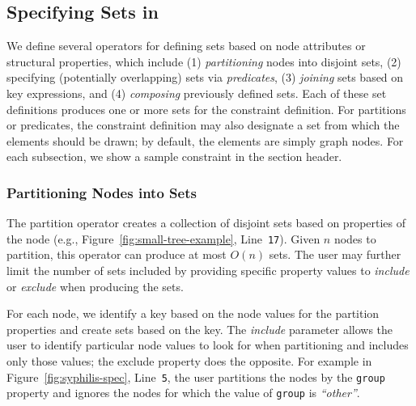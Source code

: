 \subsection{Specifying Sets in \projectname}
We define several operators for defining sets based on node attributes 
or structural properties, which include (1) \emph{partitioning} nodes 
into disjoint sets, (2) specifying (potentially overlapping) sets via
\emph{predicates}, (3) \emph{joining} sets based on key expressions,
and (4) \emph{composing} previously defined sets. Each of these set
definitions produces one or more sets for the constraint definition. For
partitions or predicates, the constraint definition may also 
designate a set from which the elements should be drawn; by default, the
elements are simply graph nodes. For each subsection, we show a sample
\projectname constraint in the section header.

\subsubsection{Partitioning Nodes into Sets}
The partition operator creates a collection of disjoint sets based on
properties of the node
(e.g., Figure~\ref{fig:small-tree-example}, Line~\texttt{17}).
Given $n$ nodes to partition, this operator can produce at most $O(n)$ 
sets. The user may further limit 
the number of sets included by providing specific property values to 
\emph{include} or \emph{exclude} when producing the sets.

For each node, we identify a key based on the node values for the partition
properties and create sets based on the key. The \emph{include} parameter allows
the user to identify particular node values to look for when partitioning
and includes only those values; the exclude property does the opposite. 
For example in Figure~\ref{fig:syphilis-spec}, Line~\texttt{5}, the user
partitions the nodes by the \texttt{group} property and ignores the nodes
for which the value of \texttt{group} is \emph{``other''}.

